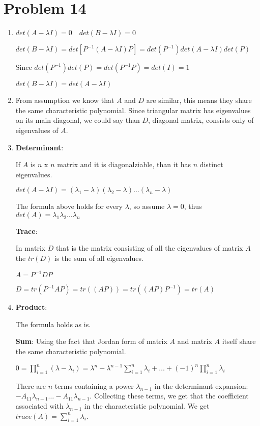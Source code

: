 \documentclass[12pt,letterpaper]{article}
\begin{document}
\section*{Problem 14}
\begin{enumerate}[label=(\alph*)]
    \item 
    $det(A - \lambda I) = 0\quad det(B - \lambda I) = 0$
    
    $det(B - \lambda I) = det[P^{-1}(A - \lambda I) P] = det(P^{-1})det(A - \lambda I)det(P)$
    
    Since $det(P^{-1})det(P) = det(P^{-1}P) = det(I) = 1$
    
    $det(B - \lambda I) = det(A - \lambda I)$
    \item
    From assumption we know that $A$ and $D$ are similar, this means they share the same characteristic polynomial. Since triangular matrix has eigenvalues on its main diagonal, we could say than $D$, diagonal matrix, consists only of eigenvalues of $A$.
    \item
    \textbf{Determinant}:
    
    If $A$ is $n$ x $n$ matrix and it is diagonalziable, than it has $n$ distinct eigenvalues.
    
    $det(A - \lambda I) = (\lambda_1 - \lambda)(\lambda_2 - \lambda)\dots(\lambda_n - \lambda)$
    
    The formula above holds for every $\lambda$, so assume $\lambda = 0$, thus $det(A) = \lambda_1\lambda_2\dots\lambda_n$
    
    \textbf{Trace}:
    
    In matrix $D$ that is the matrix consisting of all the eigenvalues of matrix $A$ the $tr(D)$ is the sum of all eigenvalues.
    
    $A = P^{-1}DP$
    
    $D = tr(P^{-1}AP) = tr((AP)) = tr((AP)P^{-1}) = tr(A)$
    \item
    \textbf{Product}:
    
    The formula holds as is.
    
    \textbf{Sum}:
    Using the fact that Jordan form of matrix $A$ and matrix $A$ itself share the same characteristic polynomial.
    
    $0 = \prod_{i=1}^n (\lambda - \lambda_i) = \lambda^n - \lambda^{n - 1}\sum_{i=1}^n\lambda_i + \dots + (-1)^n \prod_{i=1}^n \lambda_i$
    
    There are $n$ terms containing a power $\lambda_{n-1}$ in the determinant expansion: $−A_{11}\lambda_{n−1}\dots−A_{11}\lambda_{n-1}$. Collecting these terms, we get that the coefficient associated with $\lambda_{n-1}$ in the characteristic polynomial. 
    We get $trace(A) = \sum_{i=1}^n\lambda_i$.
\end{enumerate}
\end{document}
